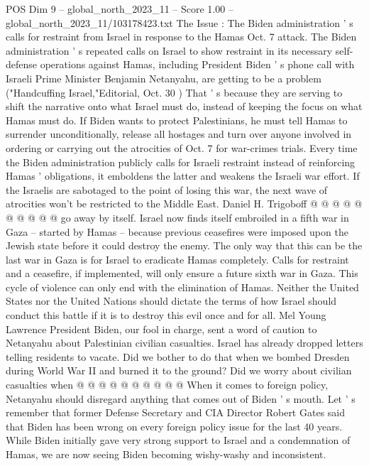 \begin{textsample}{POS Dim 9 – global\_north\_2023\_11 – Score 1.00 – global\_north\_2023\_11/103178423.txt}  \label{ex:f9_pos_154}
The Issue : The Biden administration ' s calls for restraint from Israel in response to the Hamas Oct. 7 attack.
The Biden administration ' s repeated calls on Israel to show restraint in its necessary self-defense operations against Hamas, including President Biden ' s phone call with Israeli Prime Minister Benjamin Netanyahu, are getting to be a problem ("Handcuffing Israel,"Editorial, Oct. 30 ) That ' s because they are serving to shift the narrative onto what Israel must do, instead of keeping the focus on what Hamas must do.
If Biden wants to protect Palestinians, he must tell Hamas to surrender unconditionally, release all hostages and turn over anyone involved in ordering or carrying out the atrocities of Oct. 7 for war-crimes trials.
Every time the Biden administration publicly calls for Israeli restraint instead of reinforcing Hamas ' obligations, it emboldens the latter and weakens the Israeli war effort.
If the Israelis are sabotaged to the point of losing this war, the next wave of atrocities won't be restricted to the Middle East.
Daniel H.
Trigoboff @ @ @ @ @ @ @ @ @ @ go away by itself.
Israel now finds itself embroiled in a fifth war in Gaza -- started by Hamas -- because previous ceasefires were imposed upon the Jewish state before it could destroy the enemy.
The only way that this can be the last war in Gaza is for Israel to eradicate Hamas completely.
Calls for restraint and a ceasefire, if implemented, will only ensure a future sixth war in Gaza.
This cycle of violence can only end with the elimination of Hamas.
Neither the United States nor the United Nations should dictate the terms of how Israel should conduct this battle if it is to destroy this evil once and for all.
Mel Young Lawrence President Biden, our fool in charge, sent a word of caution to Netanyahu about Palestinian civilian casualties.
Israel has already dropped letters telling residents to vacate.
Did we bother to do that when we bombed Dresden during World War II and burned it to the ground?
Did we worry about civilian casualties when @ @ @ @ @ @ @ @ @ @ When it comes to foreign policy, Netanyahu should disregard anything that comes out of Biden ' s mouth.
Let ' s remember that former Defense Secretary and CIA Director Robert Gates said that Biden has been wrong on every foreign policy issue for the last 40 years.
While Biden initially gave very strong support to Israel and a condemnation of Hamas, we are now seeing Biden becoming wishy-washy and inconsistent.

\end{textsample}

